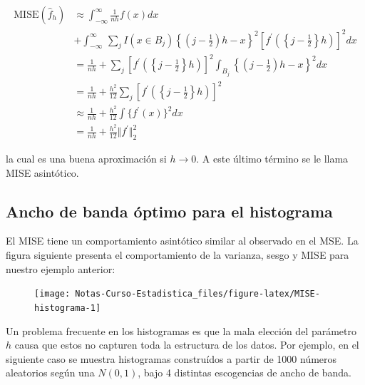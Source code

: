 \documentclass[
  12pt,
]{book}
\begin{document}
\begin{align*}
\mathrm{MISE} (\hat{f}_h)
& \approx \int_{ -\infty}^{\infty} \frac{1}{nh} f(x)dx                                                                                                                                          \\
& + \int_{ -\infty}^{\infty}\, \sum_{j}^{} I(x\in B_j) \left\{ \left( j- \frac{1}{2} \right)h -x  \right\}^2 \left [f^\prime \left( \left\{j - \frac{1}{2}\right\}h \right)  \right]^2 dx \\
& = \frac{1}{nh} + \sum_{j}^{} \left [f^\prime \left( \left\{j - \frac{1}{2}\right\}h \right)  \right]^2 \int_{ B_j}    \left\{ \left( j- \frac{1}{2} \right)h -x  \right\}^2 dx          \\
& =\frac{1}{nh} + \frac{h^2}{12} \sum_{j} \left [f^\prime \left( \left\{j - \frac{1}{2}\right\}h \right)  \right]^2                                                                       \\
& \approx \frac{1}{nh} + \frac{h^2}{12} \int \{f^\prime(x)\}^2 dx                                                                                                                         \\
& =\frac{1}{nh} + \frac{h^2}{12} \Vert f^\prime\Vert_{2}^2
\end{align*}

la cual es una buena aproximación si \(h\rightarrow 0\). A este último
término se le llama MISE asintótico.

\hypertarget{ancho-de-banda-uxf3ptimo-para-el-histograma}{%
\subsection{Ancho de banda óptimo para el
histograma}\label{ancho-de-banda-uxf3ptimo-para-el-histograma}}

El MISE tiene un comportamiento asintótico similar al observado en el
MSE. La figura siguiente presenta el comportamiento de la varianza,
sesgo y MISE para nuestro ejemplo anterior:

\begin{figure}

{\centering \texttt{[image: Notas-Curso-Estadistica\_files/figure-latex/MISE-histograma-1]} 

}

\caption{ }\label{fig:MISE-histograma}
\end{figure}

Un problema frecuente en los histogramas es que la mala elección del
parámetro \(h\) causa que estos no capturen toda la estructura de los
datos. Por ejemplo, en el siguiente caso se muestra histogramas
construídos a partir de 1000 números aleatorios según una \(N(0,1)\),
bajo 4 distintas escogencias de ancho de banda.
\end{document}
